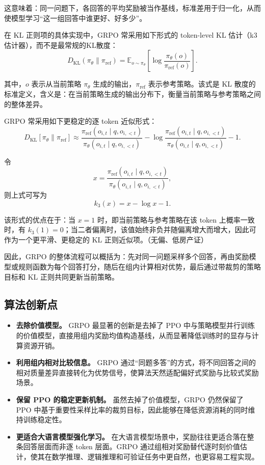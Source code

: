 \documentclass[UTF8]{ctexart}
\begin{document}
这意味着：同一问题下，各回答的平均奖励被当作基线，标准差用于归一化，从而使模型学习“这一组回答中谁更好、好多少”。

在 KL 正则项的具体实现中，GRPO 常采用如下形式的 token-level KL 估计（k3估计器），而不是最常规的KL散度：
\begin{equation}
D_{\mathrm{KL}}(\pi_\theta \| \pi_{\mathrm{ref}})
=
\mathbb{E}_{o \sim \pi_\theta}
\left[
\log \frac{\pi_\theta(o)}{\pi_{\mathrm{ref}}(o)}
\right].
\end{equation}

其中，$o$ 表示从当前策略 $\pi_\theta$ 生成的输出，$\pi_{\mathrm{ref}}$ 表示参考策略。该式是 KL 散度的标准定义，含义是：在当前策略生成的输出分布下，衡量当前策略与参考策略之间的整体差异。

GRPO 常采用如下更稳定的逐 token 近似形式：
\begin{equation}
D_{\mathrm{KL}}[\pi_\theta \| \pi_{\mathrm{ref}}]
\approx
\frac{\pi_{\mathrm{ref}}(o_{i,t}\mid q,o_{i,<t})}
{\pi_\theta(o_{i,t}\mid q,o_{i,<t})}
-
\log
\frac{\pi_{\mathrm{ref}}(o_{i,t}\mid q,o_{i,<t})}
{\pi_\theta(o_{i,t}\mid q,o_{i,<t})}
-1.
\end{equation}

令
\begin{equation}
x=
\frac{\pi_{\mathrm{ref}}(o_{i,t}\mid q,o_{i,<t})}
{\pi_\theta(o_{i,t}\mid q,o_{i,<t})},
\end{equation}
则上式可写为
\begin{equation}
k_3(x)=x-\log x-1.
\end{equation}

该形式的优点在于：当 $x=1$ 时，即当前策略与参考策略在该 token 上概率一致时，有 $k_3(1)=0$；当二者偏离时，该值始终非负并随偏离增大而增大，因此可作为一个更平滑、更稳定的 KL 正则近似项。（无偏、低房产证）

因此，GRPO 的整体流程可以概括为：先对同一问题采样多个回答，再由奖励模型或规则函数为每个回答打分，随后在组内计算相对优势，最后通过带裁剪的策略目标和 KL 正则共同更新当前策略。

\subsection{算法创新点}

\begin{itemize}
    \item \textbf{去除价值模型。} GRPO 最显著的创新是去掉了 PPO 中与策略模型并行训练的价值模型，直接用组内奖励均值构造基线，从而显著降低训练时的显存与计算资源开销。
    \item \textbf{利用组内相对比较信息。} GRPO 通过“同题多答”的方式，将不同回答之间的相对质量差异直接转化为优势信号，使算法天然适配偏好式奖励与比较式奖励场景。
    \item \textbf{保留 PPO 的稳定更新机制。} 虽然去掉了价值模型，GRPO 仍然保留了 PPO 中基于重要性采样比率的裁剪目标，因此能够在降低资源消耗的同时维持训练稳定性。
    \item \textbf{更适合大语言模型强化学习。} 在大语言模型场景中，奖励往往更适合落在整条回答层面而非逐 token 层面。GRPO 通过组相对奖励替代逐时刻价值估计，使其在数学推理、逻辑推理和可验证任务中更自然，也更容易工程实现。
\end{itemize}
\end{document}
